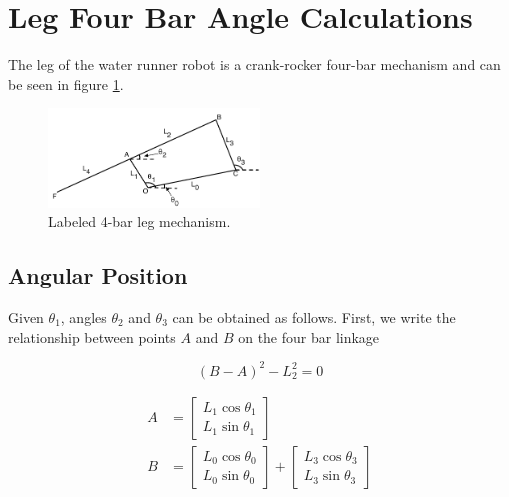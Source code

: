 \documentclass[letterpaper]{article}
\begin{document}
\section{Leg Four Bar Angle Calculations}

The leg of the water runner robot is a crank-rocker four-bar mechanism and can be seen in figure \ref{fig:4bar}.
\begin{figure}[htb]
	\centering
	\includegraphics[width = 0.5\textwidth]{4bar.pdf}
	\caption{Labeled 4-bar leg mechanism.}
	\label{fig:4bar}
\end{figure}

\subsection{Angular Position}
Given $\theta_1$, angles $\theta_2$ and $\theta_3$ can be obtained as follows. First, we write the relationship between points $A$ and $B$ on the four bar linkage

\begin{equation}
	(B - A)^2 - L_2^2 = 0
	\label{eq:BArel}
\end{equation}

\begin{align}
	A &= \begin{bmatrix} L_1 \cos \theta_1 \\ L_1 \sin \theta_1 \end{bmatrix}   \label{eq:Aloc}\\
	B &= \begin{bmatrix} L_0 \cos \theta_0 \\ L_0 \sin \theta_0 \end{bmatrix} 
			+ \begin{bmatrix} L_3 \cos \theta_3 \\ L_3 \sin \theta_3 \end{bmatrix} \label{eq:Bloc}
\end{align}
\end{document}
